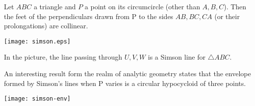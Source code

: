 \documentclass[12pt]{article}
\begin{document}
Let $ABC$ a triangle and $P$ a point on its circumcircle (other than $A,B,C$).
Then the feet of the perpendiculars drawn from P to the sides $AB,BC,CA$ (or their prolongations) are collinear.

\begin{center}
\texttt{[image: simson.eps]}
\end{center}

In the picture, the line passing through $U,V,W$ is a Simson line for $\triangle ABC$.

An interesting result form the realm of analytic geometry states that the envelope formed by Simson's lines when P  varies is a circular hypocycloid of three points.

\begin{center}
\texttt{[image: simson-env]}
\end{center}
\end{document}
